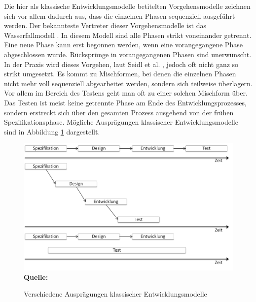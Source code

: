 Die hier als klassische Entwicklungsmodelle betitelten Vorgehensmodelle zeichnen sich vor allem dadurch aus, dass die einzelnen Phasen sequenziell ausgeführt werden. Der bekannteste Vertreter dieser Vorgehensmodelle ist das Wasserfallmodell \cite{royce_managing_1987}. In diesem Modell sind alle Phasen strikt voneinander getrennt. Eine neue Phase kann erst begonnen werden, wenn eine vorangegangene Phase abgeschlossen wurde. Rücksprünge in vorangegangenen Phasen sind unerwünscht. In der Praxis wird dieses Vorgehen, laut Seidl et al. \cite[vgl. S.22]{seidl_basiswissen_2012}, jedoch oft nicht ganz so strikt umgesetzt. Es kommt zu Mischformen, bei denen die einzelnen Phasen nicht mehr voll sequenziell abgearbeitet werden, sondern sich teilweise überlagern. Vor allem im Bereich des Testens geht man oft zu einer solchen Mischform über. Das Testen ist meist keine getrennte Phase am Ende des Entwicklungsprozesses, sondern erstreckt sich über den gesamten Prozess ausgehend von der frühen Spezifikationsphase. Mögliche Ausprägungen klassischer Entwicklungsmodelle sind in Abbildung \ref{fig:verschiedene_auspraegungen_klassischer_entwicklungsmodelle} dargestellt.

\begin{figure}[htb]
  \centering  
  \includegraphics[scale=0.7]{img/sequentielleentwicklungsmodelle.png}\\
  \footnotesize\sffamily\textbf{Quelle:} \cite[vgl. S.22]{seidl_basiswissen_2012}
  \caption{Verschiedene Ausprägungen klassischer Entwicklungsmodelle}
  \label{fig:verschiedene_auspraegungen_klassischer_entwicklungsmodelle}
\end{figure}

